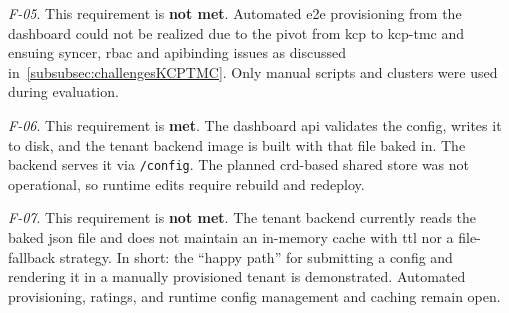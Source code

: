 \documentclass[11pt, a4paper, oneside, listof=totoc]{scrartcl}
\begin{document}
\begin{enumerate}[label={[\arabic*]:},
                    ref=Challenge~\arabic*,
                    leftmargin=*,
                    itemsep=0.6\baselineskip]
                    \item\label{chal:evalF05}
                        \textit{F-05}.
                        This requirement is \textbf{not met}.
                        Automated \gls{e2e} provisioning from the dashboard could not be realized
                        due to the pivot from \gls{kcp} to \gls{kcp}-\gls{tmc} and ensuing syncer,
                        \gls{rbac} and \gls{apibinding} issues as discussed
                        in~\autoref{subsubsec:challengesKCPTMC}.
                        Only manual scripts and clusters were used during evaluation.

                    \item\label{chal:evalF06}
                        \textit{F-06}.
                        This requirement is \textbf{met}.
                        The dashboard \gls{api} validates the config, writes it to disk, and the
                        tenant backend image is built with that file baked in.
                        The backend serves it via \texttt{/config}.
                        The planned \gls{crd}-based shared store was not operational, so runtime
                        edits require rebuild and redeploy.

                    \item\label{chal:evalF07}
                        \textit{F-07}.
                        This requirement is \textbf{not met}.
                        The tenant backend currently reads the baked \gls{json} file and does not
                        maintain an in-memory cache with \gls{ttl} nor a file-fallback strategy.
                        In short: the \enquote{happy path} for submitting a config and rendering it
                        in a manually provisioned tenant is demonstrated.
                        Automated provisioning, ratings, and runtime config management and caching
                        remain open.
            \end{enumerate}
                
\end{document}

